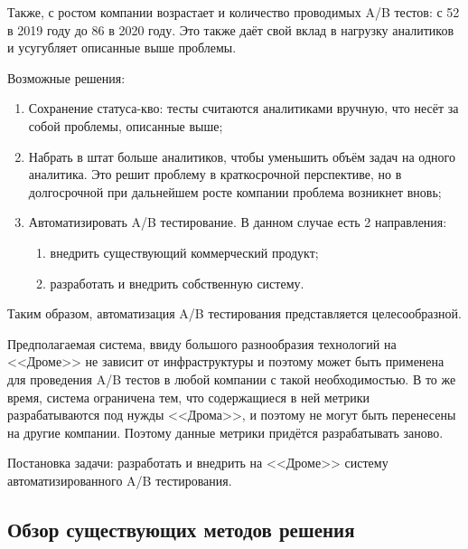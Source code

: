 \documentclass[../document.tex]{subfiles}
\begin{document}
	\par Также, с ростом компании возрастает и количество проводимых A/B тестов: с 52 в 2019 году до 86 в 2020 году. Это также даёт свой вклад в нагрузку аналитиков и усугубляет описанные выше проблемы.
	\par Возможные решения:
	\begin{enumerate}
		\item Сохранение статуса-кво: тесты считаются аналитиками вручную, что несёт за собой проблемы, описанные выше;
		\item Набрать в штат больше аналитиков, чтобы уменьшить объём задач на одного аналитика. Это решит проблему в краткосрочной перспективе, но в долгосрочной при дальнейшем росте компании проблема возникнет вновь;
		\item Автоматизировать A/B тестирование. В данном случае есть 2 направления:
		\begin{enumerate}
			\item внедрить существующий коммерческий продукт;
			\item разработать и внедрить собственную систему.
		\end{enumerate}
	\end{enumerate}
	\par Таким образом, автоматизация A/B тестирования представляется целесообразной.
	\par Предполагаемая система, ввиду большого разнообразия технологий на <<Дроме>> не зависит от инфраструктуры и поэтому может быть применена для проведения A/B тестов в любой компании с такой необходимостью. В то же время, система ограничена тем, что содержащиеся в ней метрики разрабатываются под нужды <<Дрома>>, и поэтому не могут быть перенесены на другие компании. Поэтому данные метрики придётся разрабатывать заново.
	\par Постановка задачи: разработать и внедрить на <<Дроме>> систему автоматизированного A/B тестирования.
	\subsection{Обзор существующих методов решения}
\end{document}
